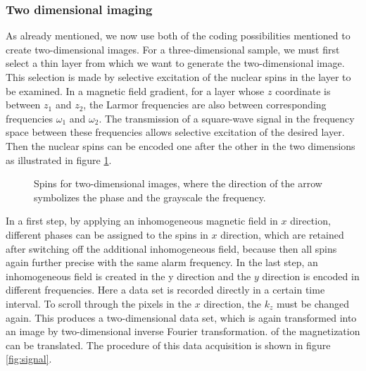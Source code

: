 \subsubsection{Two dimensional imaging}
As already mentioned, we now use both of the coding possibilities mentioned to create two-dimensional images.
For a three-dimensional sample, we must first select a thin layer from which we want to generate the two-dimensional image.
This selection is made by selective excitation of the nuclear spins in the layer to be examined.
In a magnetic field gradient, for a layer whose $z$ coordinate is between $z_1$ and $z_2$, the Larmor frequencies are also between corresponding frequencies $\omega_1$ and $\omega_2$.
The transmission of a square-wave signal in the frequency space between these frequencies allows selective excitation of the desired layer.\\
Then the nuclear spins can be encoded one after the other in the two dimensions as illustrated in figure \ref{fig:phase}.
\begin{figure}[ht]
\centering

\caption{Spins for two-dimensional images, where the direction of the arrow symbolizes the phase and the grayscale the frequency.}
\label{fig:phase}
\end{figure}
In a first step, by applying an inhomogeneous magnetic field in $x$ direction, different phases can be assigned to the spins in $x$ direction, which are retained after switching off the additional inhomogeneous field, because then all spins again further precise with the same alarm frequency.
In the last step, an inhomogeneous field is created in the y direction and the $y$ direction is encoded in different frequencies.
Here a data set is recorded directly in a certain time interval.
To scroll through the pixels in the $x$ direction, the $k_z$ must be changed again.
This produces a two-dimensional data set, which is again transformed into an image by two-dimensional inverse Fourier transformation.
of the magnetization can be translated.
The procedure of this data acquisition is shown in figure \ref{fig:signal}.
